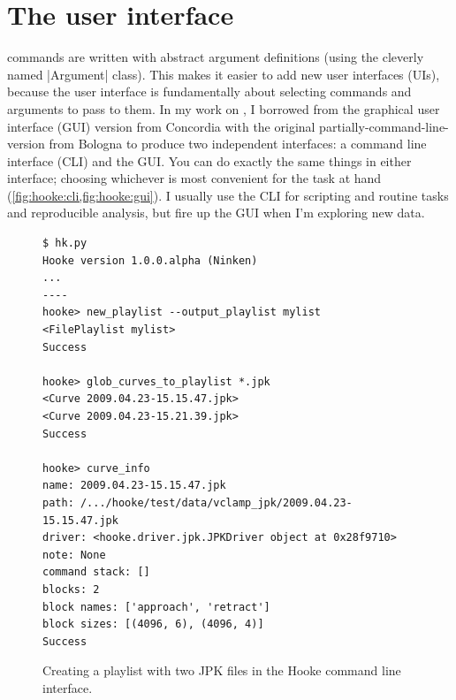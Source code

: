 \section{The user interface}
\label{sec:hooke:ui}

\Hooke commands are written with abstract argument definitions (using
the cleverly named |Argument| class).  This makes it
easier to add new user interfaces (UIs), because the user interface is
fundamentally about selecting commands and arguments to pass to them.
In my work on \Hooke, I borrowed from the graphical user interface
(GUI) version from Concordia with the original
partially-command-line-version from Bologna to produce two independent
interfaces: a command line interface (CLI) and the GUI.  You can do
exactly the same things in either interface; choosing whichever is
most convenient for the task at hand
(\cref{fig:hooke:cli,fig:hooke:gui}).  I usually use the CLI for
scripting and routine tasks and reproducible analysis, but fire up the
GUI when I'm exploring new data.

\begin{figure}
  \begin{center}
\begin{verbatim}
$ hk.py
Hooke version 1.0.0.alpha (Ninken)
...
----
hooke> new_playlist --output_playlist mylist
<FilePlaylist mylist>
Success

hooke> glob_curves_to_playlist *.jpk
<Curve 2009.04.23-15.15.47.jpk>
<Curve 2009.04.23-15.21.39.jpk>
Success

hooke> curve_info
name: 2009.04.23-15.15.47.jpk
path: /.../hooke/test/data/vclamp_jpk/2009.04.23-15.15.47.jpk
driver: <hooke.driver.jpk.JPKDriver object at 0x28f9710>
note: None
command stack: []
blocks: 2
block names: ['approach', 'retract']
block sizes: [(4096, 6), (4096, 4)]
Success
\end{verbatim}
    \caption{Creating a playlist with two JPK files in the Hooke
      command line interface.\label{fig:hooke:cli}}
  \end{center}
\end{figure}

